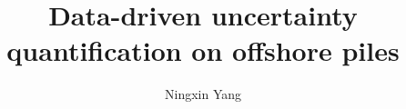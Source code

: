 \documentclass[a4paper,12pt,twoside]{report}
\begin{document}
\title{\LARGE {\bf Data-driven uncertainty quantification on offshore piles}\\
 \vspace*{6mm}
}

\author{Ningxin Yang}



\normallinespacing
\maketitle


%
%
%

\body










\appendix



%



%
\end{document}
